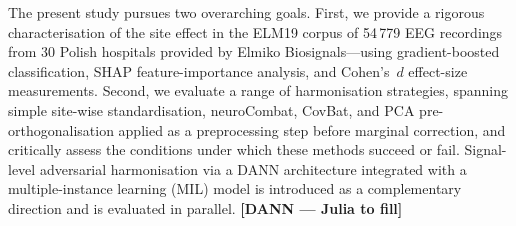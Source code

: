 \documentclass[preprint,12pt]{elsarticle}
\begin{document}
The present study pursues two overarching goals.
First, we provide a rigorous characterisation of the site effect in
the ELM19 corpus of 54\,779 EEG recordings from 30 Polish hospitals
provided by Elmiko Biosignals---using gradient-boosted classification,
SHAP feature-importance analysis, and Cohen's~$d$ effect-size
measurements.
Second, we evaluate a range of harmonisation strategies, spanning
simple site-wise standardisation, neuroCombat, CovBat, and PCA
pre-orthogonalisation applied as a preprocessing step before marginal
correction, and critically assess the conditions under which these
methods succeed or fail.
Signal-level adversarial harmonisation via a DANN architecture
integrated with a multiple-instance learning (MIL) model is
introduced as a complementary direction and is evaluated in parallel.
\textbf{[DANN --- Julia to fill]}
\end{document}
